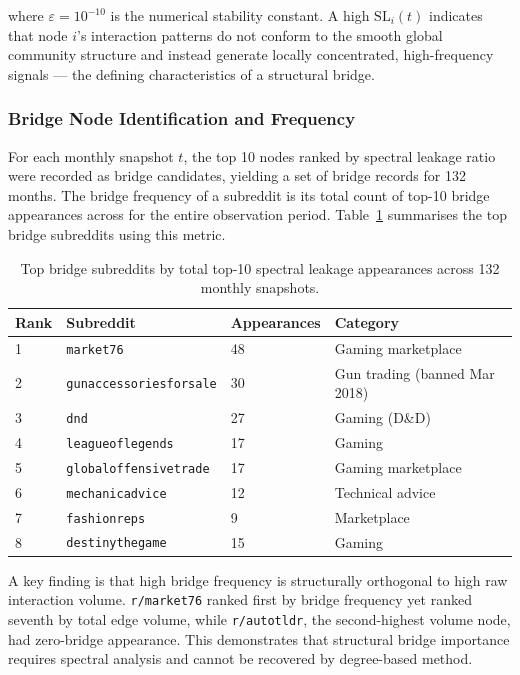 \documentclass[a4paper,fleqn]{cas-dc}
\begin{document}
where $\varepsilon = 10^{-10}$ is the numerical stability constant. A
high $\text{SL}_i(t)$ indicates that node $i$'s interaction patterns
do not conform to the smooth global community structure and instead
generate locally concentrated, high-frequency signals --- the
defining characteristics of a structural bridge.

\subsubsection{Bridge Node Identification and Frequency}
\label{subsec:bridge_identification}

For each monthly snapshot $t$, the top 10 nodes ranked by spectral
leakage ratio were recorded as bridge candidates, yielding a set of
bridge records for 132 months. The bridge frequency
of a subreddit is its total count of top-10 bridge appearances across
for the entire observation period. Table~\ref{tab:bridge_freq} summarises
the top bridge subreddits using this metric.

\begin{table}[htbp]
\centering
\caption{Top bridge subreddits by total top-10 spectral leakage appearances across 132 monthly snapshots.}
\label{tab:bridge_freq}
\begin{tabular}{llll}
\hline
\textbf{Rank} & \textbf{Subreddit} & \textbf{Appearances} & \textbf{Category} \\
\hline
1  & \texttt{market76}              & 48 & Gaming marketplace \\
2  & \texttt{gunaccessoriesforsale} & 30 & Gun trading (banned Mar 2018) \\
3  & \texttt{dnd}                   & 27 & Gaming (D\&D) \\
4  & \texttt{leagueoflegends}       & 17 & Gaming \\
5  & \texttt{globaloffensivetrade}  & 17 & Gaming marketplace \\
6  & \texttt{mechanicadvice}        & 12 & Technical advice \\
7  & \texttt{fashionreps}           &  9 & Marketplace \\
8  & \texttt{destinythegame}        & 15 & Gaming \\
\hline
\end{tabular}
\end{table}

\noindent A key finding is that high bridge frequency is structurally
orthogonal to high raw interaction volume. \texttt{r/market76} ranked
first by bridge frequency yet ranked seventh by total edge volume,
while \texttt{r/autotldr}, the second-highest volume node, had
zero-bridge appearance. This demonstrates that structural bridge
importance requires spectral analysis and cannot be recovered by
degree-based method.
\end{document}
